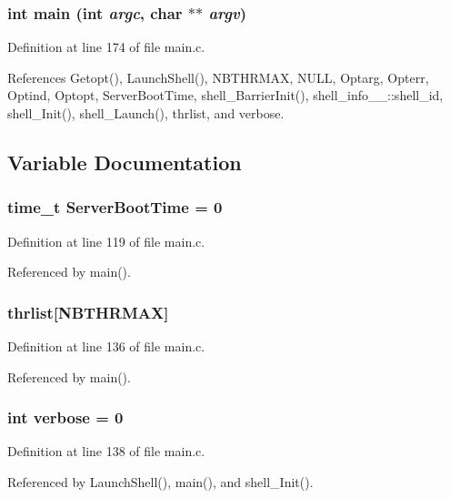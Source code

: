 \subsubsection{\setlength{\rightskip}{0pt plus 5cm}int main (int {\em argc}, char $\ast$$\ast$ {\em argv})}\label{main_8c_a6}




Definition at line 174 of file main.c.

References Getopt(), Launch\-Shell(), NBTHRMAX, NULL, Optarg, Opterr, Optind, Optopt, Server\-Boot\-Time, shell\_\-Barrier\-Init(), shell\_\-info\_\-\_\-::shell\_\-id, shell\_\-Init(), shell\_\-Launch(), thrlist, and verbose.

\subsection{Variable Documentation}
\subsubsection{\setlength{\rightskip}{0pt plus 5cm}time\_\-t {\bf Server\-Boot\-Time} = 0}\label{main_8c_a1}




Definition at line 119 of file main.c.

Referenced by main().
\subsubsection{ {\bf thrlist}[NBTHRMAX]}\label{main_8c_a3}




Definition at line 136 of file main.c.

Referenced by main().
\subsubsection{\setlength{\rightskip}{0pt plus 5cm}int {\bf verbose} = 0}\label{main_8c_a4}




Definition at line 138 of file main.c.

Referenced by Launch\-Shell(), main(), and shell\_\-Init().